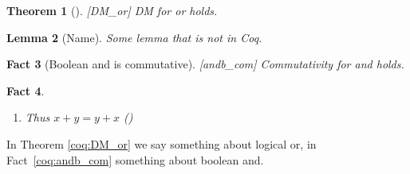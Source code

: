 \documentclass{article}
\theoremstyle{coqtheorem}
\newtheorem{theorem}{Theorem}
\newtheorem{lemma}[theorem]{Lemma}
\newtheorem{fact}[theorem]{Fact}
\begin{document}
\begin{theorem}[][DM_or]
  DM for or holds.
\end{theorem}

\begin{lemma}[Name]
  Some lemma that is not in Coq.
\end{lemma}

\begin{fact}[Boolean and is commutative][andb_com]
  Commutativity for and holds.
\end{fact}

\begin{fact}~
  \begin{enumerate}
  \coqitem[plus_O] $x + 0 = x$
  \coqitem[plus_S] $x + S y = S (x + y)$
  \item Thus $x + y = y + x$ ()
\end{enumerate}
\end{fact}

In Theorem \ref{coq:DM_or} we say something about logical or, in
Fact~\ref{coq:andb_com} something about boolean and.
\end{document}
